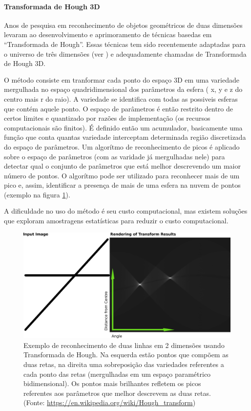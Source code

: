  \paragraph{Transformada de Hough 3D}
Anos de pesquisa em reconhecimento de objetos geométricos de duas dimensões
levaram ao desenvolvimento e aprimoramento de técnicas basedas em ``Transformada
de Hough''. Essas técnicas tem sido recentemente adaptadas para o universo de
três dimensões (ver \cite{hough2014}) e adequadamente chamadas de Transformada
de Hough 3D.

O método consiste em tranformar cada ponto do espaço 3D em uma variedade
mergulhada no espaço quadridimensional dos parâmetros da esfera ( x, y e z do
centro mais r do raio). A variedade se identifica com todas as possiveis esferas
que contém aquele ponto. O espaço de parâmetros é então restrito dentro de
certos limites e quantizado por razões de implementação (os recursos
computacionais são finitos). É definido então um acumulador, basicamente uma
função que conta quantas variedade interceptam determinada região discretizada
do espaço de parâmetros. Um algorítmo de reconhecimento de picos é aplicado
sobre o espaço de parâmetros (com as varidade já mergulhadas nele) para detectar
qual o conjunto de parâmetros que está melhor descrevendo um maior número de
pontos. O algorítmo pode ser utilizado para reconhecer mais de um pico e, assim,
identificar a presença de mais de uma esfera na nuvem de pontos (exemplo na
figura \ref{fig::hough}).

A dificuldade no uso do método é seu custo computacional, mas existem soluções
que exploram amostragens estatísticas para reduzir o custo computacional.

\begin{figure}[h!]
   \centering
   \includegraphics[width=0.95\columnwidth]{detail/figs/localizacao/hough}
   \caption{Exemplo de reconhecimento de duas linhas em 2 dimensões usando
   Transformada de Hough. Na esquerda estão pontos que compõem as duas retas, na
   direita uma sobreposição das variedades referentes a cada ponto das retas
   (mergulhadas em um espaço paramétrico bidimensional). Os pontos mais
   brilhantes refletem os picos referentes aos parâmetros que melhor descrevem as duas retas. (Fonte: 
   \url{https://en.wikipedia.org/wiki/Hough_transform})}
   \label{fig::hough}
\end{figure}

